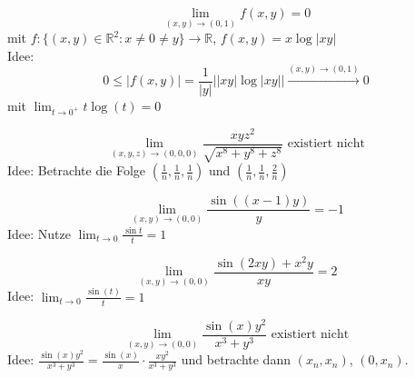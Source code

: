 \begin{displaymath}
  \lim_{(x,y) \to (0,1)} f(x,y) = 0
\end{displaymath}
mit $f : \{(x,y) \in \mathbb{R}^2: x \neq 0 \neq y\} \to \mathbb{R}$, $f(x,y) = x \log |xy|$\\
Idee:
\begin{displaymath}
  0 \leq |f(x,y)| = \frac{1}{|y|} ||xy| \log |xy|| \xrightarrow{(x,y) \to (0,1)} 0
\end{displaymath}
mit $\lim_{t \to 0^+} t\log(t) = 0$

\begin{displaymath}
  \lim_{(x,y,z) \to (0,0,0)} \frac{xyz^2}{\sqrt{x^8 + y^8 + z^8}} \text{ existiert nicht}
\end{displaymath}
Idee: Betrachte die Folge $\left(\frac{1}{n}, \frac{1}{n}, \frac{1}{n}\right)$ und $\left(\frac{1}{n}, \frac{1}{n}, \frac{2}{n}\right)$

\begin{displaymath}
  \lim_{(x,y) \to (0,0)} \frac{\sin((x-1)y)}{y} = -1
\end{displaymath}
Idee: Nutze $\lim_{t \to 0} \frac{\sin t}{t} = 1$

\begin{displaymath}
  \lim_{(x,y) \to (0,0)} \frac{\sin(2xy) + x^2y}{xy} = 2
\end{displaymath}
Idee: $\lim_{t \to 0} \frac{\sin(t)}{t} = 1$

\begin{displaymath}
  \lim_{(x,y) \to (0,0)} \frac{\sin(x)y^2}{x^3 + y^3} \text{ existiert nicht}
\end{displaymath}
Idee: $\frac{\sin(x)y^2}{x^3 + y^3} = \frac{\sin(x)}{x} \cdot \frac{xy^2}{x^3 + y^3}$ und betrachte dann $(x_n, x_n)$, $(0, x_n)$.